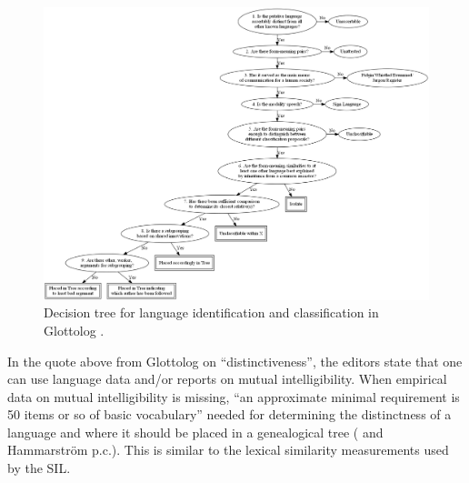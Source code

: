 \documentclass[a4paper,10pt]{article} %
\begin{document}
\begin{figure}[ht]
\centering
\includegraphics[width=16cm]{illustrations/Glottolog_classifying_tree.png}
\caption[Decision tree for language identification and classification in Glottolog]{{Decision tree for language identification and classification in Glottolog \citep{glottologlanguoids}.}}
\label{glottolog_class_tree}
\end{figure}

In the quote above from Glottolog on ``distinctiveness'', the editors state that one can use language data and/or reports on mutual intelligibility. When empirical data on mutual intelligibility is missing, ``an approximate minimal requirement is 50 items or so of basic vocabulary'' needed for determining the distinctness of a language and where it should be placed in a genealogical tree  (\citet{glottologlanguoids} and Hammarström p.c.). This is similar to the lexical similarity measurements used by the SIL.
\end{document}
